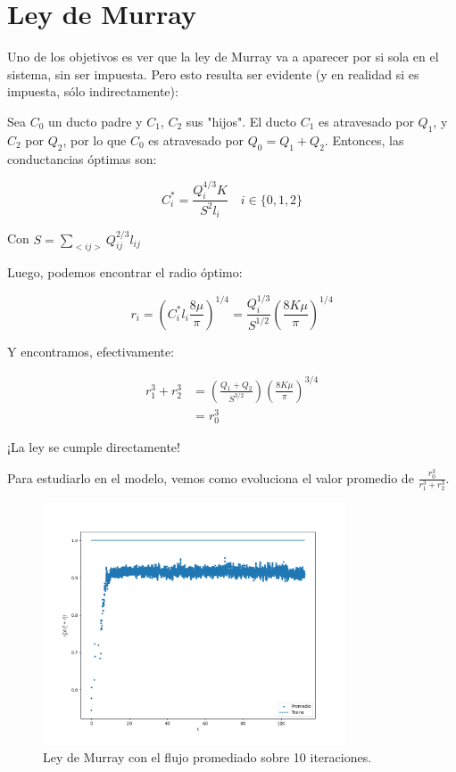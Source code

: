 \documentclass{article}
\begin{document}
\section{Ley de Murray}

Uno de los objetivos es ver que la ley de Murray va a aparecer por si sola en el sistema, sin ser impuesta.
Pero esto resulta ser evidente (y en realidad si es impuesta, sólo indirectamente):

Sea $C_0$ un ducto padre y $C_1$, $C_2$ sus "hijos". El ducto $C_1$ es atravesado por $Q_1$, y $C_2$ por $Q_2$, por lo que $C_0$ es atravesado
por $Q_0 = Q_1 + Q_2$. Entonces, las conductancias óptimas son:

$$ C_i^* = \frac{Q_i^{4/3} K}{S^2 l_i} \quad i\in\{0,1,2\} $$

Con $ S = \sum_{<ij>}Q_{ij}^{2/3}l_{ij} $

Luego, podemos encontrar el radio óptimo:

$$ r_i = \left( C_i^* l_i \frac{8 \mu}{\pi} \right)^{1/4} = \frac{Q_i^{1/3}}{S^{1/2}}\left(\frac{8K\mu}{\pi}\right)^{1/4}$$

Y encontramos, efectivamente:

\begin{align*}
    r_1^3 + r_2^3 & = \left(\frac{Q_1 + Q_2}{S^{3/2}}\right)\left(\frac{8K\mu}{\pi}\right)^{3/4} \\
    & = r_0^3
\end{align*}

¡La ley se cumple directamente!

Para estudiarlo en el modelo, vemos como evoluciona el valor promedio de $\frac{r_0^3}{r_1^3+r_2^3}$.

\begin{figure}[h!]
    \centering
    \includegraphics[width=0.8\textwidth]{graficos_inst/murray_feo.png}
    \caption{Ley de Murray con el flujo promediado sobre 10 iteraciones.}
    \label{fig:murray_feo}
\end{figure}
\end{document}
